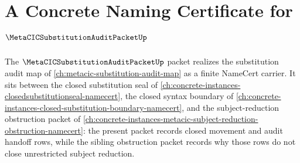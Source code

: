 \chapter{A Concrete Naming Certificate for $\MetaCICSubstitutionAuditPacketUp$}
\label{ch:concrete-instances-metacic-substitution-audit-packet-namecert}

The $\MetaCICSubstitutionAuditPacketUp$ packet realizes the substitution audit map of \autoref{ch:metacic-substitution-audit-map} as a finite NameCert carrier. It sits between the closed substitution seal of \autoref{ch:concrete-instances-closedsubstitutionseal-namecert}, the closed syntax boundary of \autoref{ch:concrete-instances-closed-substitution-boundary-namecert}, and the subject-reduction obstruction packet of \autoref{ch:concrete-instances-metacic-subject-reduction-obstruction-namecert}: the present packet records closed movement and audit handoff rows, while the sibling obstruction packet records why those rows do not close unrestricted subject reduction.

